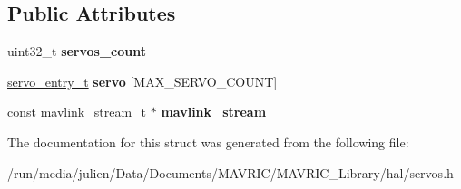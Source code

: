 \subsection*{Public Attributes}
\begin{DoxyCompactItemize}
\item 
\hypertarget{structservos__t_a21bed7170407e2ed1f34322f7c230c43}{uint32\+\_\+t {\bfseries servos\+\_\+count}}\label{structservos__t_a21bed7170407e2ed1f34322f7c230c43}

\item 
\hypertarget{structservos__t_af857c7a6b274a17bae2b4f58ac121282}{\hyperlink{structservo__entry__t}{servo\+\_\+entry\+\_\+t} {\bfseries servo} \mbox{[}M\+A\+X\+\_\+\+S\+E\+R\+V\+O\+\_\+\+C\+O\+U\+N\+T\mbox{]}}\label{structservos__t_af857c7a6b274a17bae2b4f58ac121282}

\item 
\hypertarget{structservos__t_af6c8421a3f9c929275aa8c6c2c257a33}{const \hyperlink{structmavlink__stream__t}{mavlink\+\_\+stream\+\_\+t} $\ast$ {\bfseries mavlink\+\_\+stream}}\label{structservos__t_af6c8421a3f9c929275aa8c6c2c257a33}

\end{DoxyCompactItemize}


The documentation for this struct was generated from the following file\+:\begin{DoxyCompactItemize}
\item 
/run/media/julien/\+Data/\+Documents/\+M\+A\+V\+R\+I\+C/\+M\+A\+V\+R\+I\+C\+\_\+\+Library/hal/servos.\+h\end{DoxyCompactItemize}
